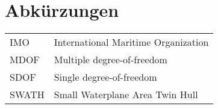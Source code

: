 \chapter*{Abkürzungen}

\begin{longtable}[l]{@{}p{50pt} p{200pt}}
IMO     &  International Maritime Organization\\
MDOF    &  Multiple degree-of-freedom\\
SDOF    &  Single degree-of-freedom\\
SWATH   &  Small Waterplane Area Twin Hull\\
\end{longtable}
